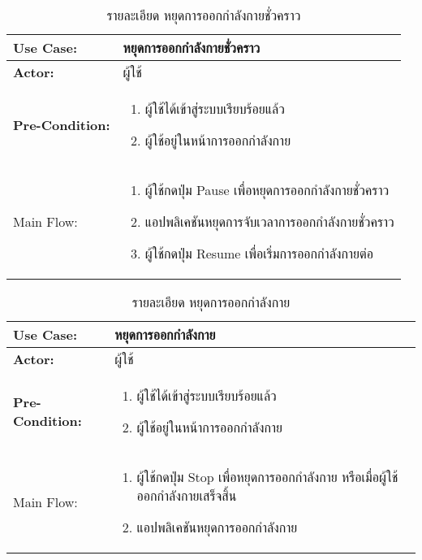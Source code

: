 \begin{table}
    \caption{รายละเอียด หยุดการออกกำลังกายชั่วคราว}
    \begin{tabularx}{\textwidth}{ | >{\centering\bf} p{3cm} | X |}
        \hline
        Use Case: & หยุดการออกกำลังกายชั่วคราว \\\hline
        Actor: & ผู้ใช้ \\\hline
        Pre-Condition: &
        \begin{enumerate}[table]
            \item ผู้ใช้ได้เข้าสู่ระบบเรียบร้อยแล้ว
            \item ผู้ใช้อยู่ในหน้าการออกกำลังกาย
        \end{enumerate} \\\hline
        
        Main Flow: & 
        \begin{enumerate}[table]
            \item ผู้ใช้กดปุ่ม Pause เพื่อหยุดการออกกำลังกายชั่วคราว
            \item แอปพลิเคชันหยุดการจับเวลาการออกกำลังกายชั่วคราว
            \item ผู้ใช้กดปุ่ม Resume เพื่อเริ่มการออกกำลังกายต่อ
        \end{enumerate}\\\hline
    \end{tabularx}
\end{table}

\begin{table}
    \caption{รายละเอียด หยุดการออกกำลังกาย}
    \begin{tabularx}{\textwidth}{ | >{\centering\bf} p{3cm} | X |}
        \hline
        Use Case: & หยุดการออกกำลังกาย \\\hline
        Actor: & ผู้ใช้ \\\hline
        Pre-Condition: &
        \begin{enumerate}[table]
            \item ผู้ใช้ได้เข้าสู่ระบบเรียบร้อยแล้ว
            \item ผู้ใช้อยู่ในหน้าการออกกำลังกาย
        \end{enumerate} \\\hline
        
        Main Flow: & 
        \begin{enumerate}[table]
            \item ผู้ใช้กดปุ่ม Stop เพื่อหยุดการออกกำลังกาย หรือเมื่อผู้ใช้ออกกำลังกายเสร็จสิ้น
            \item แอปพลิเคชันหยุดการออกกำลังกาย
        \end{enumerate}\\\hline
    \end{tabularx}
\end{table}

